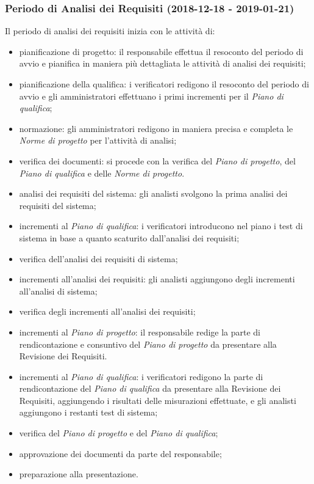 	\subsubsection{Periodo di Analisi dei Requisiti (2018-12-18 - 2019-01-21)}	
 Il periodo di analisi dei requisiti inizia con le attività di:
			\begin{itemize}
				\item pianificazione di progetto: il responsabile effettua il resoconto del periodo di avvio e pianifica in maniera più dettagliata le attività di analisi dei requisiti; 
				\item pianificazione della qualifica: i verificatori redigono il resoconto del periodo di avvio e gli amministratori effettuano i primi incrementi per il \textit{Piano di qualifica};
				\item normazione: gli amministratori redigono in maniera precisa e completa le \textit{Norme di progetto} per l'attività di analisi;
				\item verifica dei documenti: si procede con la verifica del \textit{Piano di progetto}, del \textit{Piano di qualifica} e delle \textit{Norme di progetto}.
				\item analisi dei requisiti del sistema: gli analisti svolgono la prima analisi dei requisiti del sistema;
				\item incrementi al \textit{Piano di qualifica}: i verificatori introducono nel piano i test di sistema in base a quanto scaturito dall'analisi dei requisiti;
				\item verifica dell'analisi dei requisiti di sistema;
				\item incrementi all'analisi dei requisiti: gli analisti aggiungono degli incrementi all'analisi di sistema;
				\item verifica degli incrementi all'analisi dei requisiti;
				\item incrementi al \textit{Piano di progetto}: il responsabile redige la parte di rendicontazione e consuntivo del \textit{Piano di progetto} da presentare alla Revisione dei Requisiti.
				\item incrementi al \textit{Piano di qualifica}: i verificatori redigono la parte di rendicontazione del \textit{Piano di qualifica} da presentare alla Revisione dei Requisiti, aggiungendo i risultati delle misurazioni effettuate, e gli analisti aggiungono i restanti test di sistema;
				\item verifica del \textit{Piano di progetto} e del \textit{Piano di qualifica};
				\item approvazione dei documenti da parte del responsabile;
				\item preparazione alla presentazione.			
			\end{itemize}